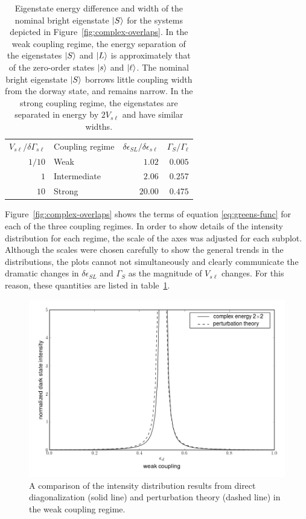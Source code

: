\documentclass[12pt]{mitthesis}
\begin{document}
\begin{table}
  \caption{Eigenstate energy difference and width of the nominal
    bright eigenstate $\mathinner{|{S}\rangle}$ for the systems depicted in 
    Figure~\ref{fig:complex-overlaps}.  In the weak coupling regime, 
    the energy separation of the eigenstates $\mathinner{|{S}\rangle}$ and $\mathinner{|{L}\rangle}$ 
    is approximately that of the zero-order states $\mathinner{|{s}\rangle}$ and 
    $\mathinner{|{\ell}\rangle}$.  The nominal bright eigenstate $\mathinner{|{S}\rangle}$ borrows 
    little coupling width from the dorway state, and remains narrow.
    In the strong coupling regime, the eigenstates are
    separated in energy by $2V_{s\ell}$ and have similar widths.}
  \label{table:complex-int-params}
  \centering
  \begin{tabular}{rlrr}
    & \\
    \toprule
    $V_{s\ell} / \delta \Gamma_{s\ell}$ & Coupling regime & $\delta
    \epsilon_{SL} / \delta \epsilon_{s\ell}$ & $\Gamma_S / \Gamma_{\ell}$ \\
    \midrule
    $1/10$ & Weak & $1.02$ & $0.005$ \\
    $1$ & Intermediate & $2.06$ & $0.257$ \\
    $10$ & Strong & $20.00$ & $0.475$ \\
    \bottomrule
  \end{tabular}
\end{table}
Figure~\ref{fig:complex-overlaps} shows the terms of equation
\ref{eq:greens-func} for each of the three coupling regimes. In order
to show details of the intensity distribution for each regime, the
scale of the axes was adjusted for each subplot. Although the scales
were chosen carefully to show the general trends in the distributions,
the plots cannot not simultaneously and clearly communicate the
dramatic changes in $\delta \epsilon_{SL}$ and $\Gamma_S$ as the
magnitude of $V_{s\ell}$ changes. For this reason, these quantities
are listed in table~\ref{table:complex-int-params}.

\begin{figure}
  \caption{A comparison of the intensity distribution results from
    direct diagonalization (solid line) and perturbation theory
    (dashed line) in the weak coupling regime.}
  \label{fig:complex-compare-weak}
  \centering
  \includegraphics[width=6in]{complex-compare-weak.png}
\end{figure}
\end{document}
